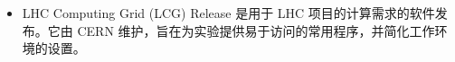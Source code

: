 \begin{itemize}
	\item LHC Computing Grid (LCG) Release 是用于 LHC 项目的计算需求的软件发布。它由 CERN 维护，旨在为实验提供易于访问的常用程序，并简化工作环境的设置。
	
\end{itemize}
